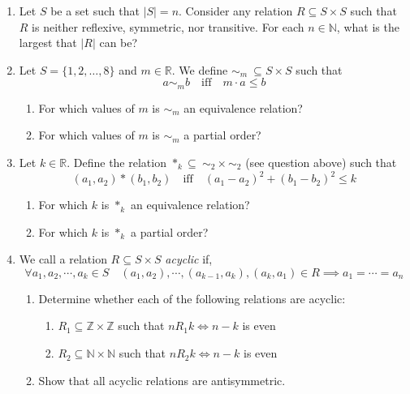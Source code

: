 \documentclass[a4paper, 12pt]{article}
\begin{document}
\begin{enumerate}

    \item Let $S$ be a set such that $|S|=n$. 
    Consider any relation $R \subseteq S \times S$ such that $R$ is neither reflexive, symmetric, nor transitive.
    For each $n \in \mathbb{N}$, what is the largest that $|R|$ can be?
    

    \item Let $S = \{1, 2, \dots, 8 \}$ and $m \in \mathbb{R}$. We define $\sim_m \> \subseteq S \times S$ such that
    \begin{equation*}
        a \sim_m b \quad \text{iff} \quad m \cdot a \leq b
    \end{equation*}
     
    \begin{enumerate}
        \item For which values of $m$ is $\sim_m$ an equivalence relation? 
        \item For which values of $m$ is $\sim_m$ a partial order?
    \end{enumerate}

    \item
    Let $k \in \mathbb{R}$. Define the relation $*_k \subseteq \> \sim_2 \times \sim_2$ (see question above) such that
    \begin{equation*}
        (a_1, a_2) * (b_1, b_2) \quad \text{iff} \quad (a_1-a_2)^2+(b_1-b_2)^2 \leq k
    \end{equation*}

    \begin{enumerate}
        \item For which $k$ is $*_k$ an equivalence relation? 
        \item For which $k$ is $*_k$ a partial order?
    \end{enumerate}

    \item We call a relation $R \subseteq S \times S$ \textit{acyclic} if,
    \begin{equation*}
        \forall a_1, a_2, \cdots, a_k \in S \quad (a_1, a_2), \cdots, (a_{k-1}, a_k), (a_k, a_1) \in R \implies a_1 = \cdots = a_n
    \end{equation*}

    \begin{enumerate}
        \item Determine whether each of the following relations are acyclic:
        \begin{enumerate}
            \item $R_1 \subseteq \mathbb{Z} \times \mathbb{Z}$ such that $n R_1 k \Longleftrightarrow n - k$ is even
            \item $R_2 \subseteq \mathbb{N} \times \mathbb{N}$ such that $n R_2 k \Longleftrightarrow n - k$ is even
        \end{enumerate}
        \item Show that all acyclic relations are antisymmetric.
    \end{enumerate}

\end{enumerate}
\end{document}
